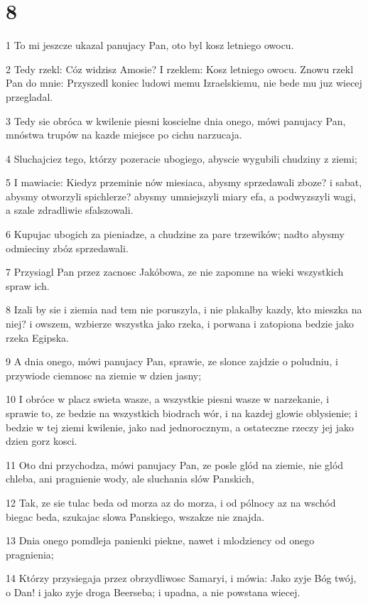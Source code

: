 \chapter{8}

\par 1 To mi jeszcze ukazal panujacy Pan, oto byl kosz letniego owocu.
\par 2 Tedy rzekl: Cóz widzisz Amosie? I rzeklem: Kosz letniego owocu. Znowu rzekl Pan do mnie: Przyszedl koniec ludowi memu Izraelskiemu, nie bede mu juz wiecej przegladal.
\par 3 Tedy sie obróca w kwilenie piesni koscielne dnia onego, mówi panujacy Pan, mnóstwa trupów na kazde miejsce po cichu narzucaja.
\par 4 Sluchajciez tego, którzy pozeracie ubogiego, abyscie wygubili chudziny z ziemi;
\par 5 I mawiacie: Kiedyz przeminie nów miesiaca, abysmy sprzedawali zboze? i sabat, abysmy otworzyli spichlerze? abysmy umniejszyli miary efa, a podwyzszyli wagi, a szale zdradliwie sfalszowali.
\par 6 Kupujac ubogich za pieniadze, a chudzine za pare trzewików; nadto abysmy odmieciny zbóz sprzedawali.
\par 7 Przysiagl Pan przez zacnosc Jakóbowa, ze nie zapomne na wieki wszystkich spraw ich.
\par 8 Izali by sie i ziemia nad tem nie poruszyla, i nie plakalby kazdy, kto mieszka na niej? i owszem, wzbierze wszystka jako rzeka, i porwana i zatopiona bedzie jako rzeka Egipska.
\par 9 A dnia onego, mówi panujacy Pan, sprawie, ze slonce zajdzie o poludniu, i przywiode ciemnosc na ziemie w dzien jasny;
\par 10 I obróce w placz swieta wasze, a wszystkie piesni wasze w narzekanie, i sprawie to, ze bedzie na wszystkich biodrach wór, i na kazdej glowie oblysienie; i bedzie w tej ziemi kwilenie, jako nad jednorocznym, a ostateczne rzeczy jej jako dzien gorz kosci.
\par 11 Oto dni przychodza, mówi panujacy Pan, ze posle glód na ziemie, nie glód chleba, ani pragnienie wody, ale sluchania slów Panskich,
\par 12 Tak, ze sie tulac beda od morza az do morza, i od pólnocy az na wschód biegac beda, szukajac slowa Panskiego, wszakze nie znajda.
\par 13 Dnia onego pomdleja panienki piekne, nawet i mlodziency od onego pragnienia;
\par 14 Którzy przysiegaja przez obrzydliwosc Samaryi, i mówia: Jako zyje Bóg twój, o Dan! i jako zyje droga Beerseba; i upadna, a nie powstana wiecej.

